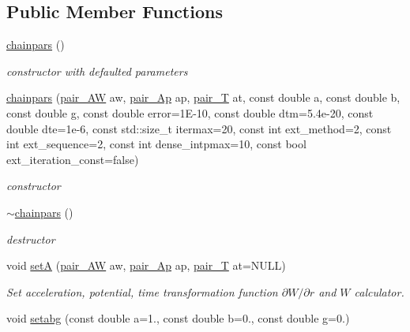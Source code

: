 \subsection*{Public Member Functions}
\begin{DoxyCompactItemize}
\item 
\hyperlink{classARC_1_1chainpars_acd96bd2a8505efe4a1b5613d30c8d221}{chainpars} ()
\begin{DoxyCompactList}\small\item\em constructor with defaulted parameters \end{DoxyCompactList}\item 
\hyperlink{classARC_1_1chainpars_aa52fe89cf4e13a3d8062324c6a2fd22f}{chainpars} (\hyperlink{classARC_1_1chainpars_a766866c2e38b475767a4f8529624a378}{pair\+\_\+\+AW} aw, \hyperlink{classARC_1_1chainpars_aa34d083090c50f572d2126262e169474}{pair\+\_\+\+Ap} ap, \hyperlink{classARC_1_1chainpars_a343fccd377d7215a4af2e909f3f9acf6}{pair\+\_\+T} at, const double a, const double b, const double g, const double error=1\+E-\/10, const double dtm=5.\+4e-\/20, const double dte=1e-\/6, const std\+::size\+\_\+t itermax=20, const int ext\+\_\+method=2, const int ext\+\_\+sequence=2, const int dense\+\_\+intpmax=10, const bool ext\+\_\+iteration\+\_\+const=false)
\begin{DoxyCompactList}\small\item\em constructor \end{DoxyCompactList}\item 
\hyperlink{classARC_1_1chainpars_a845a35853f213671423ace05aad18176}{$\sim$chainpars} ()
\begin{DoxyCompactList}\small\item\em destructor \end{DoxyCompactList}\item 
void \hyperlink{classARC_1_1chainpars_a3636273acac1bb08f2fbccc44568ce9a}{setA} (\hyperlink{classARC_1_1chainpars_a766866c2e38b475767a4f8529624a378}{pair\+\_\+\+AW} aw, \hyperlink{classARC_1_1chainpars_aa34d083090c50f572d2126262e169474}{pair\+\_\+\+Ap} ap, \hyperlink{classARC_1_1chainpars_a343fccd377d7215a4af2e909f3f9acf6}{pair\+\_\+T} at=N\+U\+LL)
\begin{DoxyCompactList}\small\item\em Set acceleration, potential, time transformation function $\partial W/\partial r$ and $W$ calculator. \end{DoxyCompactList}\item 
void \hyperlink{classARC_1_1chainpars_a69a3dba492a0c1f817dad9ea13c6fb07}{setabg} (const double a=1., const double b=0., const double g=0.)

\end{DoxyCompactItemize}
